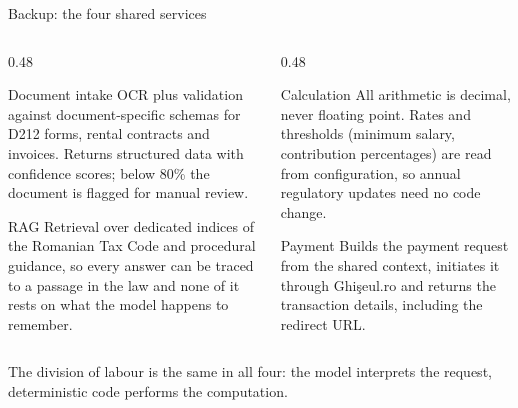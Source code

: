 \documentclass[aspectratio=169,10pt]{beamer}
\newcommand{\cmt}[1]{{\color{stone}\small #1}}          %
\begin{document}
\begin{frame}[noframenumbering]{Backup: the four shared services}
  \begin{columns}[T]
    \begin{column}{0.48\textwidth}
      \begin{block}{Document intake}
        \small OCR plus validation against document-specific schemas for D212 forms, rental
        contracts and invoices. Returns structured data with confidence scores; below 80\%
        the document is flagged for manual review.
      \end{block}
      \begin{block}{RAG}
        \small Retrieval over dedicated indices of the Romanian Tax Code and procedural
        guidance, so every answer can be traced to a passage in the law and none of it rests
        on what the model happens to remember.
      \end{block}
    \end{column}
    \begin{column}{0.48\textwidth}
      \begin{block}{Calculation}
        \small All arithmetic is decimal, never floating point. Rates and thresholds
        (minimum salary, contribution percentages) are read from configuration, so annual
        regulatory updates need no code change.
      \end{block}
      \begin{block}{Payment}
        \small Builds the payment request from the shared context, initiates it through
        Ghi\c{s}eul.ro and returns the transaction details, including the redirect URL.
      \end{block}
    \end{column}
  \end{columns}
  \vfill
  \cmt{The division of labour is the same in all four: the model interprets the request,
  deterministic code performs the computation.}
\end{frame}
\end{document}
